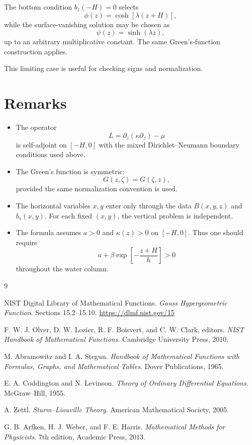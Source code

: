 \documentclass[10pt]{amsart}
\begin{document}
The bottom condition \(b_z(-H)=0\) selects
\begin{equation}
\phi(z)=\cosh\!\left[\lambda(z+H)\right],
\end{equation}
while the surface-vanishing solution may be chosen as
\begin{equation}
\psi(z)=\sinh(\lambda z),
\end{equation}
up to an arbitrary multiplicative constant. The same Green's-function construction applies.

This limiting case is useful for checking signs and normalization.

\section{Remarks}

\begin{itemize}
    \item The operator
    \[
    L=\partial_z(\kappa \partial_z)-\mu
    \]
    is self-adjoint on \([-H,0]\) with the mixed Dirichlet--Neumann boundary conditions used above.

    \item The Green's function is symmetric:
    \[
    G(z,\zeta)=G(\zeta,z),
    \]
    provided the same normalization convention is used.

    \item The horizontal variables \(x,y\) enter only through the data \(B(x,y,z)\) and \(b_s(x,y)\). For each fixed \((x,y)\), the vertical problem is independent.

    \item The formula assumes \(a>0\) and \(\kappa(z)>0\) on \([-H,0]\). Thus one should require
    \[
    a+\beta \exp\!\left[-\frac{z+H}{h}\right] >0
    \]
    throughout the water column.
\end{itemize}

\begin{thebibliography}{9}

NIST Digital Library of Mathematical Functions.
\newblock \emph{Gauss Hypergeometric Function}.
\newblock Sections 15.2--15.10.
\newblock \url{https://dlmf.nist.gov/15}

F. W. J. Olver, D. W. Lozier, R. F. Boisvert, and C. W. Clark, editors.
\newblock \emph{NIST Handbook of Mathematical Functions}.
\newblock Cambridge University Press, 2010.

M. Abramowitz and I. A. Stegun.
\newblock \emph{Handbook of Mathematical Functions with Formulas, Graphs, and Mathematical Tables}.
\newblock Dover Publications, 1965.

E. A. Coddington and N. Levinson.
\newblock \emph{Theory of Ordinary Differential Equations}.
\newblock McGraw--Hill, 1955.

A. Zettl.
\newblock \emph{Sturm--Liouville Theory}.
\newblock American Mathematical Society, 2005.

G. B. Arfken, H. J. Weber, and F. E. Harris.
\newblock \emph{Mathematical Methods for Physicists}.
\newblock 7th edition, Academic Press, 2013.

\end{thebibliography}
\end{document}
